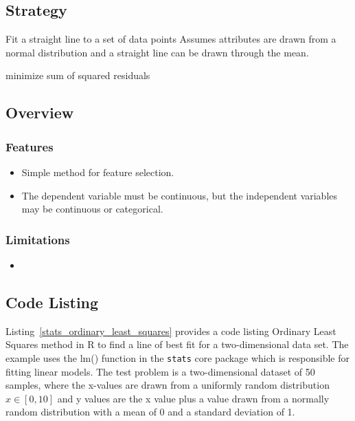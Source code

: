 \subsection{Strategy}

Fit a straight line to a set of data points
Assumes attributes are drawn from a normal distribution and a straight line can be drawn through the mean.

minimize sum of squared residuals


\subsection{Overview}

\subsubsection{Features}

\begin{itemize}
	\item Simple method for feature selection.
	\item The dependent variable must be continuous, but the independent variables may be continuous or categorical.
\end{itemize}

\subsubsection{Limitations}

\begin{itemize}
	\item 
\end{itemize}

\subsection{Code Listing}
Listing~\ref{stats_ordinary_least_squares} provides a code listing Ordinary Least Squares method in R to find a line of best fit for a two-dimensional data set.
The example uses the {lm()} function in the \texttt{stats} core package which is responsible for fitting linear models.
The test problem is a two-dimensional dataset of 50 samples, where the x-values are drawn from a uniformly random distribution $x \in [0,10]$ and y values are the x value plus a value drawn from a normally random 
distribution with a mean of 0 and a standard deviation of 1.

